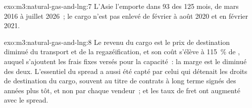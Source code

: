 \begin{solution}{exo:m3:natural-gas-and-lng:7}
L'Asie l'emporte dans 93 des 125 mois, de mars 2016 à juillet 2026~; le cargo n'est pas
enlevé de février à août 2020 et en février 2021.
\end{solution}

\begin{solution}{exo:m3:natural-gas-and-lng:8}
Le revenu du cargo est le prix de destination diminué du transport et de la regazéification, et son
coût s'élève à 115~\% de , auquel s'ajoutent les frais fixes versés pour la capacité~: la marge est le
 diminué des deux. L'essentiel du spread a aussi été capté par celui qui détenait les
droits de destination du cargo, souvent au titre de contrats à long terme signés des années plus tôt, et non par chaque
vendeur~; et les taux de fret ont augmenté avec le spread.
\end{solution}

